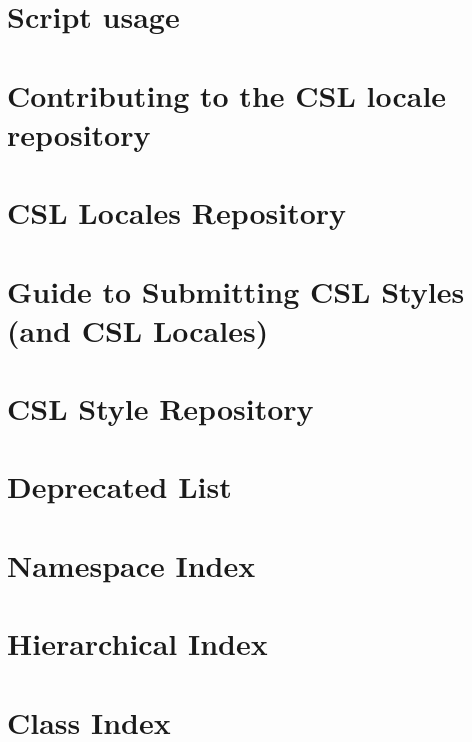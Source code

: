 \let\mypdfximage\pdfximage\def\pdfximage{\immediate\mypdfximage}\documentclass[twoside]{book}
\newcommand{\+}{\discretionary{\mbox{\scriptsize$\hookleftarrow$}}{}{}}
\begin{document}
\chapter{Script usage}
\label{md_scripts__r_e_a_d_m_e}

\chapter{Contributing to the C\+SL locale repository}
\label{md_src_main_resources_csl-locales__c_o_n_t_r_i_b_u_t_i_n_g}

\chapter{C\+SL Locales Repository}
\label{md_src_main_resources_csl-locales__r_e_a_d_m_e}

\chapter{Guide to Submitting C\+SL Styles (and C\+SL Locales)}
\label{md_src_main_resources_csl-styles__c_o_n_t_r_i_b_u_t_i_n_g}

\chapter{C\+SL Style Repository}
\label{md_src_main_resources_csl-styles__r_e_a_d_m_e}

\chapter{Deprecated List}
\label{deprecated}

\chapter{Namespace Index}

\chapter{Hierarchical Index}

\chapter{Class Index}

\end{document}
